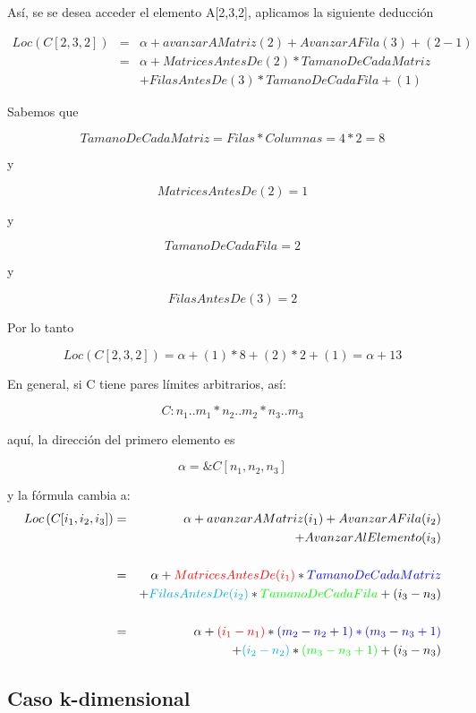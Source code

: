 Así, se se desea acceder el elemento A[2,3,2], aplicamos la siguiente
deducción

\begin{eqnarray*}
  Loc \left( C[2,3,2] \right) &=& \alpha + avanzarAMatriz(2) + AvanzarAFila(3) +  (2 - 1)\\
  &=& \alpha + MatricesAntesDe(2)*TamanoDeCadaMatriz \\
  & & + FilasAntesDe(3)*TamanoDeCadaFila + (1)
\end{eqnarray*}

Sabemos que

$$ TamanoDeCadaMatriz = Filas * Columnas = 4 * 2 = 8 $$

y

$$ MatricesAntesDe(2) = 1 $$

y

$$TamanoDeCadaFila=2$$

y

$$ FilasAntesDe(3) = 2 $$

Por lo tanto

$$Loc \left( C[2,3,2] \right) = \alpha + (1)*8 + (2)*2 + (1) = \alpha + 13$$

En general, si C tiene pares límites arbitrarios,  así:

$$C: n_1..m_1 * n_2..m_2 * n_3..m_3$$

aquí, la dirección del primero elemento es

$$ \alpha = \&C[n_1, n_2, n_3]$$

y la fórmula cambia a:
\begin{eqnarray*}
  Loc \left( C[i_1, i_2, i_3] \right) &=& \alpha + avanzarAMatriz(i_1) + AvanzarAFila(i_2) \\
  & & + AvanzarAlElemento(i_3)\\
  \\
  &=& \alpha+\textcolor{red}{MatricesAntesDe(i_1)}*\textcolor{blue}{TamanoDeCadaMatriz}\\
  & &+\textcolor{cyan}{FilasAntesDe(i_2)} * \textcolor{green}{TamanoDeCadaFila}+(i_3-n_3)\\
  \\
  &=& \alpha + \textcolor{red}{(i_1-n_1)}* \textcolor{blue}{(m_2-n_2+1)*(m_3-n_3+1)}\\
  & &+\textcolor{cyan}{(i_2-n_2)}*\textcolor{green}{(m_3-n_3+1)}+(i_3-n_3)
\end{eqnarray*}

\subsection{Caso k-dimensional}
\label{sec:caso-k-dimensional}

